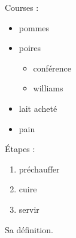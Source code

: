 Courses :

\begin{itemize}
\tightlist
\item
  pommes
\item
  poires

  \begin{itemize}
  \tightlist
  \item
    conférence
  \item
    williams
  \end{itemize}
\item[$\boxtimes$]
  lait acheté
\item[$\square$]
  pain
\end{itemize}

Étapes :

\begin{enumerate}
\def\labelenumi{\arabic{enumi}.}
\tightlist
\item
  préchauffer
\item
  cuire
\item
  servir
\end{enumerate}

\begin{description}
\tightlist
\item[Terme]
Sa définition.
\end{description}
